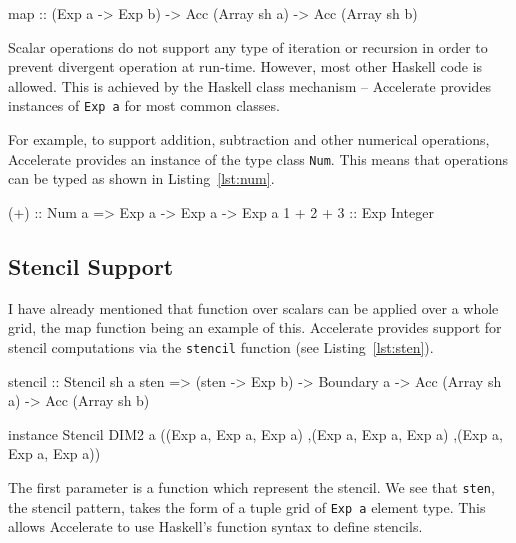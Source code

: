 \documentclass[12pt,a4paper,twoside]{scrbook}
\begin{document}
\begin{hflisting}[label={lst:map}, caption=The type of the \texttt{map}
  operation as defined by Accelerate.]
map :: (Exp a -> Exp b) -> Acc (Array sh a)
       -> Acc (Array sh b)
\end{hflisting}

Scalar operations do not support any type of iteration or recursion in order to
prevent divergent operation at run-time. However, most other Haskell code is
allowed. This is achieved by the Haskell class mechanism -- Accelerate provides
instances of \texttt{Exp a} for most common classes.

For example, to support addition, subtraction and other numerical operations,
Accelerate provides an instance of the type class \texttt{Num}. This means that
operations can be typed as shown in Listing~\ref{lst:num}.

\begin{hflisting}[label={lst:num}, caption=The type of addition overloaded by Accelerate.]
(+) :: Num a => Exp a -> Exp a -> Exp a
1 + 2 + 3 :: Exp Integer
\end{hflisting}

\subsection{Stencil Support}

I have already mentioned that function over scalars can be applied over
a whole grid, the map function being an example of this. Accelerate
provides support for stencil computations via the \texttt{stencil}
function (see Listing~\ref{lst:sten}).

\begin{hflisting}[label={lst:sten}, caption={The type of the stencil application
  function in Accelerate. I have also included an example instance of the
  \texttt{Stencil} type class. Many others are also possible.}]
stencil :: Stencil sh a sten =>
           (sten -> Exp b) ->
           Boundary a ->
           Acc (Array sh a) ->
           Acc (Array sh b)

instance Stencil DIM2 a ((Exp a, Exp a, Exp a)
                        ,(Exp a, Exp a, Exp a)
                        ,(Exp a, Exp a, Exp a))
\end{hflisting}

The first parameter is a function which represent the stencil. We see
that \texttt{sten}, the stencil pattern, takes the form of a tuple grid
of \texttt{Exp a} element type. This allows Accelerate to use Haskell's
function syntax to define stencils.
\end{document}
